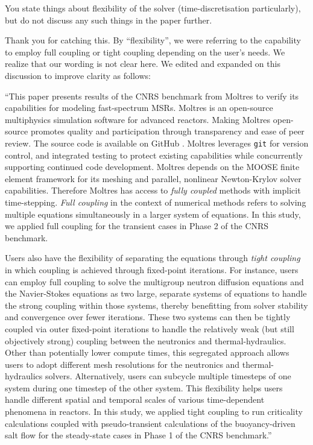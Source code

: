 \documentclass[answers,12pt]{exam}
\begin{document}
\begin{questions}
        \question You state things about flexibility of the solver
        (time-discretisation particularly), but do not discuss any such things
        in the paper further.
        \begin{solution}
        	Thank you for catching this. By ``flexibility'', we were referring
        	to the capability to employ full coupling or tight coupling
        	depending on the user's needs. We realize that our wording is not
        	clear here. We edited and expanded on this discussion to improve
        	clarity as follows:
        	
        	``This paper presents results of the CNRS benchmark from Moltres
to verify its capabilities for modeling fast-spectrum \glspl{MSR}. Moltres
is an open-source multiphysics simulation software for advanced reactors.
Making Moltres open-source promotes quality and participation through
transparency and ease of peer review. The source code
\cite{lindsay_moltres_2017} is available on GitHub \cite{github_build_2017}.
Moltres leverages \texttt{git} for version control, and integrated testing to
protect existing capabilities while concurrently supporting continued code
development. Moltres depends on the \gls{MOOSE} finite element framework for
its meshing and parallel, nonlinear Newton-Krylov solver capabilities.
Therefore Moltres has access to \textit{fully coupled} methods with implicit
time-stepping. \textit{Full coupling} in the context of numerical methods
refers to solving multiple equations simultaneously in a larger system of
equations. In this study, we applied full coupling for the transient
cases in Phase 2 of the CNRS benchmark.

Users also have the flexibility of separating the equations through
\textit{tight coupling} in which coupling is achieved through
fixed-point iterations. For instance, users can employ full coupling to solve
the multigroup neutron diffusion equations and the Navier-Stokes equations as
two large, separate systems of equations to handle the strong coupling within
those systems, thereby benefitting from solver stability and convergence
over fewer iterations. These two systems can then be tightly coupled via outer
fixed-point iterations to handle the relatively weak (but still objectively
strong) coupling between the neutronics and thermal-hydraulics. Other than
potentially lower compute times, this segregated approach allows users to adopt
different mesh resolutions for the neutronics and thermal-hydraulics solvers.
Alternatively, users can subcycle multiple timesteps of one system during one
timestep of the other system. This flexibility helps users handle different
spatial and temporal scales of various
time-dependent phenomena in reactors. In this study, we applied tight coupling
to run criticality calculations coupled with pseudo-transient calculations of
the buoyancy-driven salt flow for the steady-state cases in Phase 1 of the CNRS
benchmark.''
        \end{solution}


\end{questions}
\end{document}
